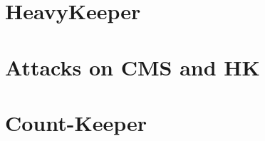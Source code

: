 \section{HeavyKeeper}\label{sec:hk}
   
   

\section{Attacks on CMS and HK}\label{sec:attacks}


\section{Count-Keeper}\label{sec:ck}

